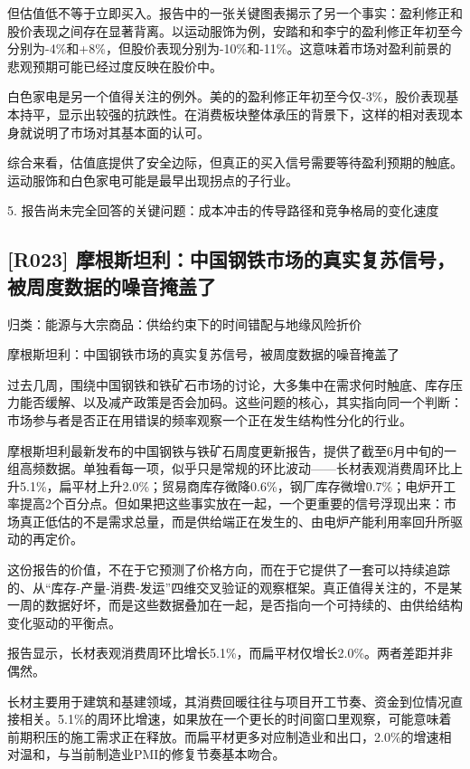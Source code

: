 \documentclass[11pt]{ctexart}
\begin{document}
但估值低不等于立即买入。报告中的一张关键图表揭示了另一个事实：盈利修正和股价表现之间存在显著背离。以运动服饰为例，安踏和和李宁的盈利修正年初至今分别为-4\%和+8\%，但股价表现分别为-10\%和-11\%。这意味着市场对盈利前景的悲观预期可能已经过度反映在股价中。

白色家电是另一个值得关注的例外。美的的盈利修正年初至今仅-3\%，股价表现基本持平，显示出较强的抗跌性。在消费板块整体承压的背景下，这样的相对表现本身就说明了市场对其基本面的认可。

综合来看，估值底提供了安全边际，但真正的买入信号需要等待盈利预期的触底。运动服饰和白色家电可能是最早出现拐点的子行业。

5. 报告尚未完全回答的关键问题：成本冲击的传导路径和竞争格局的变化速度

\subsection{[R023] 摩根斯坦利：中国钢铁市场的真实复苏信号，被周度数据的噪音掩盖了}
{\small\color{refgray}归类：能源与大宗商品：供给约束下的时间错配与地缘风险折价}

摩根斯坦利：中国钢铁市场的真实复苏信号，被周度数据的噪音掩盖了

过去几周，围绕中国钢铁和铁矿石市场的讨论，大多集中在需求何时触底、库存压力能否缓解、以及减产政策是否会加码。这些问题的核心，其实指向同一个判断：市场参与者是否正在用错误的频率观察一个正在发生结构性分化的行业。

摩根斯坦利最新发布的中国钢铁与铁矿石周度更新报告，提供了截至6月中旬的一组高频数据。单独看每一项，似乎只是常规的环比波动——长材表观消费周环比上升5.1\%，扁平材上升2.0\%；贸易商库存微降0.6\%，钢厂库存微增0.7\%；电炉开工率提高2个百分点。但如果把这些事实放在一起，一个更重要的信号浮现出来：市场真正低估的不是需求总量，而是供给端正在发生的、由电炉产能利用率回升所驱动的再定价。

这份报告的价值，不在于它预测了价格方向，而在于它提供了一套可以持续追踪的、从“库存-产量-消费-发运”四维交叉验证的观察框架。真正值得关注的，不是某一周的数据好坏，而是这些数据叠加在一起，是否指向一个可持续的、由供给结构变化驱动的平衡点。

报告显示，长材表观消费周环比增长5.1\%，而扁平材仅增长2.0\%。两者差距并非偶然。

长材主要用于建筑和基建领域，其消费回暖往往与项目开工节奏、资金到位情况直接相关。5.1\%的周环比增速，如果放在一个更长的时间窗口里观察，可能意味着前期积压的施工需求正在释放。而扁平材更多对应制造业和出口，2.0\%的增速相对温和，与当前制造业PMI的修复节奏基本吻合。
\end{document}
